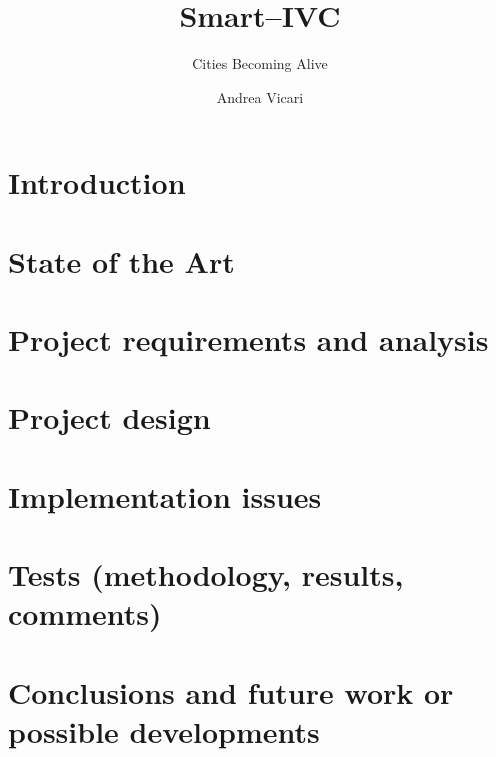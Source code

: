 \documentclass[]{usiinfbachelorproject}
\author{Andrea Vicari}
\title{Smart--IVC}
\subtitle{Cities Becoming Alive}
\begin{document}
\maketitle

\section{Introduction} \label{introduction}

\section{State of the Art} \label{stateOfTheArt}

\section{Project requirements and analysis} \label{projectRequirementsAndAnalysis}

\section{Project design} \label{projectDesign}

\section{Implementation issues} \label{implementationIssues}

\section{Tests (methodology, results, comments)} \label{tests}

\section{Conclusions and future work or possible developments} \label{conclusions}


\end{document}
